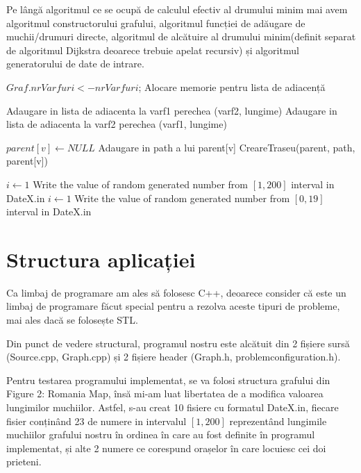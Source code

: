 \documentclass[a4paper]{article}
\begin{document}
Pe lângă algoritmul ce se ocupă de calculul efectiv al drumului minim mai avem algoritmul constructorului grafului, algoritmul funcției de adăugare de muchii/drumuri directe, algoritmul de alcătuire al drumului minim(definit separat de algoritmul Dijkstra deoarece trebuie apelat recursiv) și algoritmul generatorului de date de intrare.
\begin{codebox}
\li $Graf.nrVarfuri <- nrVarfuri$;
\li Alocare memorie pentru lista de adiacență
\end{codebox}

\begin{codebox}
\li Adaugare in lista de adiacenta la varf1 perechea (varf2, lungime)
\li Adaugare in lista de adiacenta la varf2 perechea (varf1, lungime)
\end{codebox}

\begin{codebox}
\li \If $parent[v] \gets NULL$ \Do
\li Adaugare in path a lui parent[v]
\li CreareTraseu(parent, path, parent[v])
\End
\end{codebox}

\begin{codebox}
\li \For $i \gets 1$  \Do
\li Write the value of random generated number from $[1, 200]$ interval in DateX.in
\End
\li \For $i \gets 1$  \Do
\li Write the value of random generated number from $[0, 19]$ interval in DateX.in
\End
\end{codebox}

\section{Structura aplicației}

Ca limbaj de programare am ales să folosesc C++, deoarece consider că este un limbaj de programare făcut special pentru a rezolva aceste tipuri de probleme, mai ales dacă se folosește STL.

Din punct de vedere structural, programul nostru este alcătuit din 2 fișiere sursă (Source.cpp, Graph.cpp) și 2 fișiere header (Graph.h, problemconfiguration.h).

Pentru testarea programului implementat, se va folosi structura grafului din Figure 2: Romania Map, însă mi-am luat libertatea de a modifica valoarea lungimilor muchiilor.
Astfel, s-au creat 10 fisiere cu formatul DateX.in, fiecare fisier conținând 23 de numere in intervalul $[1, 200]$ reprezentând lungimile muchiilor grafului nostru în ordinea în care au fost definite în programul implementat, și alte 2 numere ce corespund orașelor în care locuiesc cei doi prieteni. 
\end{document}
